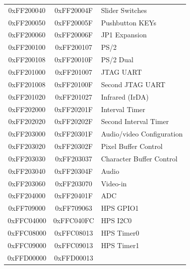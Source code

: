 \documentclass[11pt, twoside, pdftex]{article}
\begin{document}
\begin{table}[h]
\begin{center}
\begin{tabular}{c|c|l}
        \\
            0xFF200040
            & 0xFF20004F
            & Slider Switches
        \\
            0xFF200050
            & 0xFF20005F
            & Pushbutton KEYs
        \\
            0xFF200060
            & 0xFF20006F
            & JP1 Expansion
        \\
            0xFF200100
            & 0xFF200107
            & PS/2
        \\
            0xFF200108
            & 0xFF20010F
            & PS/2 Dual
        \\
            0xFF201000
            & 0xFF201007
            & JTAG UART
        \\
            0xFF201008
            & 0xFF20100F
            & Second JTAG UART
        \\
            0xFF201020
            & 0xFF201027
				& Infrared (IrDA)
        \\
            0xFF202000
            & 0xFF20201F
            & Interval Timer
        \\
            0xFF202020
            & 0xFF20202F
            & Second Interval Timer
        \\
            0xFF203000
            & 0xFF20301F
            & Audio/video Configuration
        \\
            0xFF203020
            & 0xFF20302F
            & Pixel Buffer Control
        \\
            0xFF203030
            & 0xFF203037
            & Character Buffer Control
        \\
            0xFF203040
            & 0xFF20304F
            & Audio
        \\
            0xFF203060
            & 0xFF203070
            & Video-in
        \\
            0xFF204000
            & 0xFF20401F
            & ADC
        \\
            0xFF709000
            & 0xFF709063
            & HPS GPIO1
        \\
            0xFFC04000
            & 0xFFC040FC
            & HPS I2C0
        \\
            0xFFC08000
            & 0xFFC08013
            & HPS Timer0
        \\
            0xFFC09000
            & 0xFFC09013
            & HPS Timer1
        \\
            0xFFD00000
            & 0xFFD00013

\end{tabular}
\end{center}
\end{table}
\end{document}
